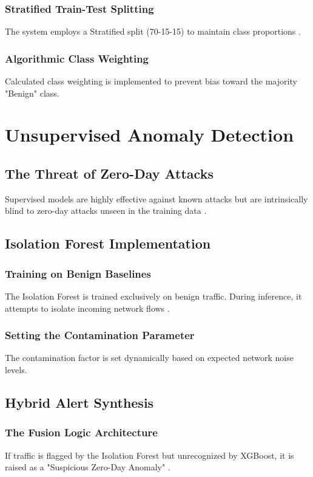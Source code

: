 \documentclass[12pt, a4paper]{report}
\begin{document}
\subsection{Stratified Train-Test Splitting}
The system employs a Stratified split (70-15-15) to maintain class proportions \cite{ref2}.
\subsection{Algorithmic Class Weighting}
Calculated class weighting is implemented to prevent bias toward the majority "Benign" class.

\chapter{Unsupervised Anomaly Detection}
\section{The Threat of Zero-Day Attacks}
Supervised models are highly effective against known attacks but are intrinsically blind to zero-day attacks unseen in the training data \cite{ref4}.

\section{Isolation Forest Implementation}
\subsection{Training on Benign Baselines}
The Isolation Forest is trained exclusively on benign traffic. During inference, it attempts to isolate incoming network flows \cite{ref5}.
\subsection{Setting the Contamination Parameter}
The contamination factor is set dynamically based on expected network noise levels.

\section{Hybrid Alert Synthesis}
\subsection{The Fusion Logic Architecture}
If traffic is flagged by the Isolation Forest but unrecognized by XGBoost, it is raised as a "Suspicious Zero-Day Anomaly" \cite{ref6}.
\end{document}
